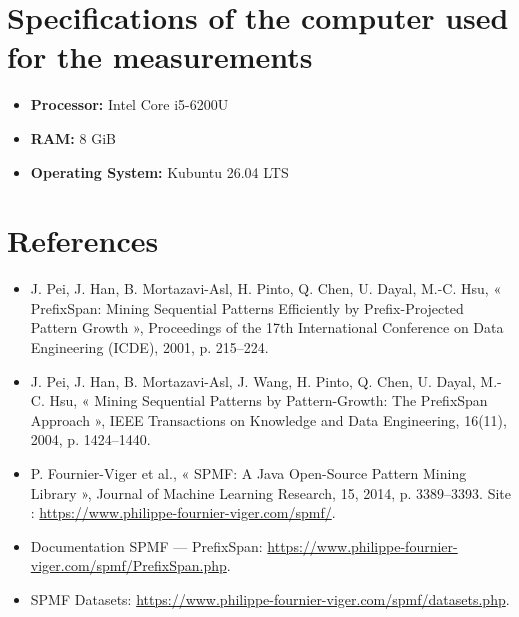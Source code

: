 \documentclass[11pt,a4paper]{article}
\begin{document}
\section*{Specifications of the computer used for the measurements}

\begin{itemize}
	\item \textbf{Processor:} Intel Core i5-6200U
	\item \textbf{RAM:} 8 GiB
	\item \textbf{Operating System:} Kubuntu 26.04 LTS
\end{itemize}


\section*{References}

\begin{itemize}
	\item J. Pei, J. Han, B. Mortazavi-Asl, H. Pinto, Q. Chen, U. Dayal, M.-C. Hsu, « PrefixSpan: Mining Sequential Patterns Efficiently by Prefix-Projected Pattern Growth », Proceedings of the 17th International Conference on Data Engineering (ICDE), 2001, p. 215–224.
	\item J. Pei, J. Han, B. Mortazavi-Asl, J. Wang, H. Pinto, Q. Chen, U. Dayal, M.-C. Hsu, « Mining Sequential Patterns by Pattern-Growth: The PrefixSpan Approach », IEEE Transactions on Knowledge and Data Engineering, 16(11), 2004, p. 1424–1440.
	\item P. Fournier-Viger et al., « SPMF: A Java Open-Source Pattern Mining Library », Journal of Machine Learning Research, 15, 2014, p. 3389–3393. Site : \url{https://www.philippe-fournier-viger.com/spmf/}.
	\item Documentation SPMF — PrefixSpan: \url{https://www.philippe-fournier-viger.com/spmf/PrefixSpan.php}.
	\item SPMF Datasets: \url{https://www.philippe-fournier-viger.com/spmf/datasets.php}.
\end{itemize}
\end{document}
